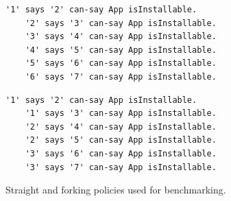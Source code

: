 \documentclass[]{llncs}
\begin{document}
\begin{figure}\centering
  \begin{minipage}{0.49\linewidth}
    \begin{lstlisting}[basicstyle=\ttfamily\scriptsize, keywordstyle=\ttfamily\slshape\scriptsize]
    '1' says '2' can-say App isInstallable.
    '2' says '3' can-say App isInstallable.
    '3' says '4' can-say App isInstallable.
    '4' says '5' can-say App isInstallable.
    '5' says '6' can-say App isInstallable.
    '6' says '7' can-say App isInstallable.
    \end{lstlisting}
  \end{minipage}
  \begin{minipage}{0.49\linewidth}
    \begin{lstlisting}[basicstyle=\ttfamily\scriptsize, keywordstyle=\ttfamily\slshape\scriptsize]
    '1' says '2' can-say App isInstallable.
    '1' says '3' can-say App isInstallable.
    '2' says '4' can-say App isInstallable.
    '2' says '5' can-say App isInstallable.
    '3' says '6' can-say App isInstallable.
    '3' says '7' can-say App isInstallable.
    \end{lstlisting}
  \end{minipage}
  \caption{Straight and forking policies used for benchmarking.}
  \label{fig:policy-snippet}
\end{figure}
\end{document}
